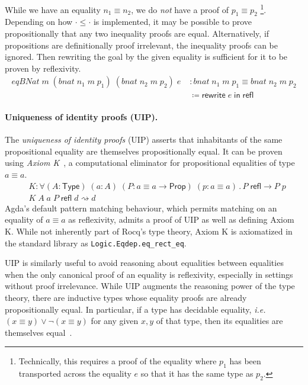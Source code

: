 \documentclass{article}
\makeatletter
\newcommand{\ie}{\textit{i.e.}\@\xspace}
\newcommand{\kw}[1]{\mathsf{#1}}
\newcommand{\code}[1]{\texttt{#1}}
\makeatother
\begin{document}
%
While we have an equality $n_1 \equiv n_2$,
we do \emph{not} have a proof of $p_1 \equiv p_2$%
\footnote{Technically, this requires a proof of the equality
where $p_1$ has been transported across the equality $e$
so that it has the same type as $p_2$.}.
Depending on how $\cdot \le \cdot$ is implemented,
it may be possible to prove propositionally that any two inequality proofs are equal.
Alternatively, if propositions are definitionally proof irrelevant,
the inequality proofs can be ignored.
Then rewriting the goal by the given equality is sufficient
for it to be proven by reflexivity.
%
\begin{align*}
  \mathit{eqBNat} \; m \; (\mathit{bnat} \; n_1 \; m \; p_1) \; (\mathit{bnat} \; n_2 \; m \; p_2) \; e \;
    &: \mathit{bnat} \; n_1 \; m \; p_1 \equiv \mathit{bnat} \; n_2 \; m \; p_2 \\
    &\coloneqq \kw{rewrite} \; e \; \kw{in} \; \kw{refl}
\end{align*}

\paragraph{Uniqueness of identity proofs (UIP).}
The \emph{uniqueness of identity proofs} (UIP)
asserts that inhabitants of the same propositional equality
are themselves propositionally equal.
It can be proven using \emph{Axiom K}~\citep{axiomk},
a computational eliminator for propositional equalities of type $a \equiv a$.
%
\begin{align*}
  &K : \forall (A : \kw{Type}) \; (a : A) \; (P : a \equiv a \to \kw{Prop}) \; (p : a \equiv a) \mathpunct{.}
    P \; \kw{refl} \to P \; p \\
  &K \; A \; a \; P \; \kw{refl} \; d \rightsquigarrow d
\end{align*}
%
Agda's default pattern matching behaviour,
which permits matching on an equality of $a \equiv a$ as reflexivity,
admits a proof of UIP as well as defining Axiom K.
While not inherently part of Rocq's type theory,
Axiom K is axiomatized in the standard library as \code{Logic.Eqdep.eq\_rect\_eq}.

UIP is similarly useful to avoid reasoning about equalities between equalities
when the only canonical proof of an equality is reflexivity,
especially in settings without proof irrelevance.
While UIP augments the reasoning power of the type theory,
there are inductive types whose equality proofs are already propositionally equal.
In particular, if a type has decidable equality,
\ie $(x \equiv y) \vee \neg (x \equiv y)$ for any given $x, y$ of that type,
then its equalities are themselves equal~\citep{hedberg}.
\end{document}
